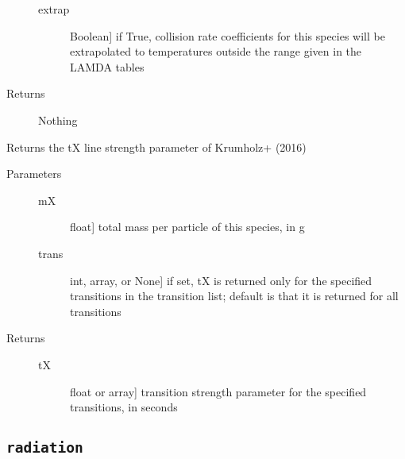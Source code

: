 \documentclass[letterpaper,10pt,english]{sphinxmanual}
\begin{document}
\begin{fulllineitems}
\begin{fulllineitems}
\begin{description}
\begin{description}
\item[{extrap}] \leavevmode{[}Boolean{]}
if True, collision rate coefficients for this species will
be extrapolated to temperatures outside the range given in
the LAMDA tables

\end{description}

\item[{Returns}] \leavevmode
Nothing

\end{description}

\end{fulllineitems}


\begin{fulllineitems}
\label{fulldoc:despotic.emitterData.tX}
Returns the tX line strength parameter of Krumholz+ (2016)
\begin{description}
\item[{Parameters}] \leavevmode\begin{description}
\item[{mX}] \leavevmode{[}float{]}
total mass per particle of this species, in g

\item[{trans}] \leavevmode{[}int, array, or None{]}
if set, tX is returned only for the specified
transitions in the transition list; default is that it
is returned for all transitions

\end{description}

\item[{Returns}] \leavevmode\begin{description}
\item[{tX}] \leavevmode{[}float or array{]}
transition strength parameter for the specified
transitions, in seconds

\end{description}

\end{description}

\end{fulllineitems}


\end{fulllineitems}



\subsection{\texttt{radiation}}
\label{fulldoc:radiation}
\end{document}
